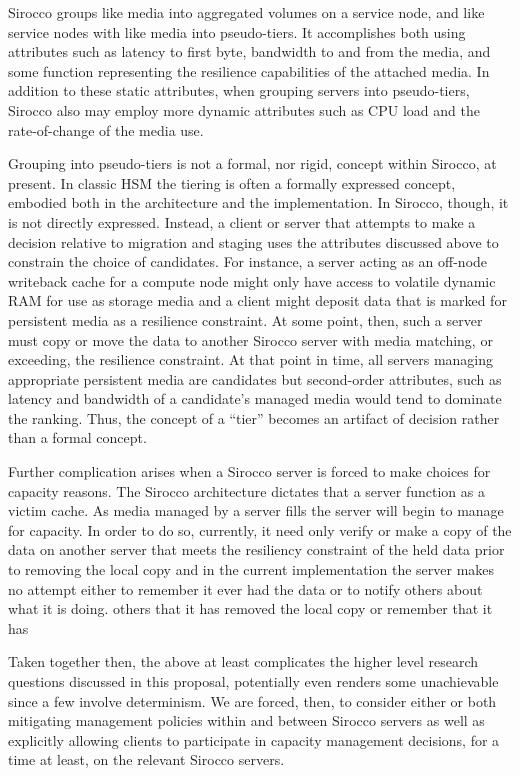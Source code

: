 Sirocco groups like media into aggregated volumes on a service node, and like
service nodes with like media into pseudo-tiers. It accomplishes both using
attributes such as latency to first byte, bandwidth to and from the media, and
some function representing the resilience capabilities of the attached media.
In addition to these static attributes, when grouping servers into
pseudo-tiers, Sirocco also may employ more dynamic attributes such as CPU load
and the rate-of-change of the media use.

Grouping into pseudo-tiers is not a formal, nor rigid, concept within Sirocco,
at present. In classic HSM the tiering is often a formally expressed concept,
embodied both in the architecture and the implementation. In Sirocco, though,
it is not directly expressed. Instead, a client or server that attempts to make
a decision relative to migration and staging uses the attributes discussed
above to constrain the choice of candidates. For instance, a server acting as
an off-node writeback cache for a compute node might only have access to
volatile dynamic RAM for use as storage media and a client might deposit data
that is marked for persistent media as a resilience constraint. At some point,
then, such a server must copy or move the data to another Sirocco server with
media matching, or exceeding, the resilience constraint. At that point in time,
all servers managing appropriate persistent media are candidates but
second-order attributes, such as latency and bandwidth of a candidate's managed
media would tend to dominate the ranking. Thus, the concept of a ``tier''
becomes an artifact of decision rather than a formal concept.

Further complication arises when a Sirocco server is forced to make choices for
capacity reasons. The Sirocco architecture dictates that a server function as a
victim cache. As media managed by a server fills the server will begin to
manage for capacity. In order to do so, currently, it need only verify or make
a copy of the data on another server that meets the resiliency constraint of
the held data prior to removing the local copy and in the current
implementation the server makes no attempt either to remember it ever had the
data or to notify others about what it is doing.  others that it has removed
the local copy or remember that it has 

Taken together then, the above at least complicates the higher level research
questions discussed in this proposal, potentially even renders some
unachievable since a few involve determinism. We are forced, then, to consider
either or both mitigating management policies within and between Sirocco
servers as well as explicitly allowing clients to participate in capacity
management decisions, for a time at least, on the relevant Sirocco servers.

